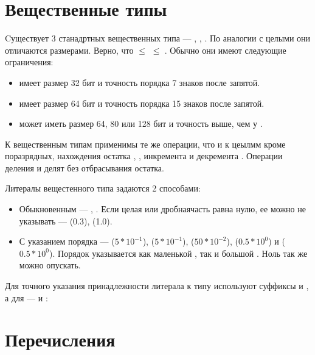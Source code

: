 \documentclass[book.tex]{subfiles}
\begin{document}
\section*{Вещественные типы}

Cуществует 3 станадртных вещественных типа --- , , . По аналогии с целыми они отличаются размерами. Верно, что  $\leq$  $\leq$ . Обычно они имеют следующие ограничения:

\begin{itemize}
\item {} имеет размер 32 бит и точность порядка 7 знаков после запятой.
\item {} имеет размер 64 бит и точность порядка 15 знаков после запятой.
\item {} может иметь размер 64, 80 или 128 бит и точность выше, чем у .
\end{itemize}

К вещественным типам применимы те же операции, что и к цеылмм кроме поразрядных, нахождения остатка \cppword{\%}, \cppword{\%=}, инкремента \cppword{++} и декремента \cppword{--}. Операции деления \cppword{/} и \cppword{/=} делят без отбрасывания остатка.

Литералы вещестенного типа задаются 2 способами:

\begin{itemize}
\item Обыкновенным --- , . Если целая или дробнаячасть равна нулю, ее можно не указывать ---  (0.3),  (1.0).
\item С указанием порядка ---  ($5*10^{-1}$),  ($5*10^{-1}$),  ($50*10^{-2}$),  ($0.5*10^{0}$) и  ($0.5*10^{0}$). Порядок указывается как маленькой , так и большой . Ноль так же можно опускать.
\end{itemize}

Для точного указания принадлежности литерала к типу  используют суффиксы  и , а для  ---  и :


\section*{Перечисления}
\end{document}
